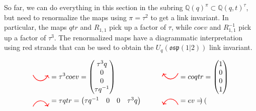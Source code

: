 \documentclass{amsart}
\newcommand{\hackcenter}[1]{
 \xy (0,0)*{#1}; \endxy}
\def\Q{\mathsf{Q}}
\theoremstyle{plain}
\theoremstyle{definition}
\theoremstyle{definition}
\numberwithin{equation}{section}
\numberwithin{theorem}{section}
\def\mf{\mathfrak}
\def\Q{\mathbb{Q}}
\numberwithin{equation}{section}
\begin{document}
So far, we can do everything in this section in the subring $\Q(q)^\pi\subset \Q(q,t)^\tau$, but need to renormalize the maps using $\pi=\tau^2$ to get a link invariant.
In particular, the maps $qtr$ and $R_{1,1}$ pick up a factor of $\tau$, while $coev$ and $R_{1,1}^{-1}$ pick up a factor of $\tau^3$.
The renormalized maps have a diagrammatic interpretation using red strands that can be used to obtain the $U_q({\mf{osp}(1|2)})$ link invariant.

\begin{align}\label{eq:red-maps}
  \hackcenter{ \begin{tikzpicture} [scale=.75]
\draw[thick,   red, ->] (0,1).. controls ++(.25,-.5) and ++(-.25,-.5).. (1,1);
\end{tikzpicture}} & = \tau^3 coev =
\begin{pmatrix}
     \tau^3q \\
     0 \\
     0 \\
     \tau q^{-1}
   \end{pmatrix}  & \qquad \hackcenter{ \begin{tikzpicture} [scale=.75]
\draw[thick,   red, <-] (0,1).. controls ++(.25,-.5) and ++(-.25,-.5).. (1,1);
\end{tikzpicture}} & = coqtr =
\begin{pmatrix}
     1 \\
     0 \\
     0 \\
     1
   \end{pmatrix} \\
\hackcenter{ \begin{tikzpicture} [scale=.75]
\draw[thick,   red, ->] (0,0).. controls ++(.25,.5) and ++(-.25,.5).. (1,0);
\end{tikzpicture}} & = \tau qtr =
\begin{pmatrix}
    \tau q^{-1} & 0 & 0 & \tau^3 q
  \end{pmatrix} & \qquad \hackcenter{ \begin{tikzpicture} [scale=.75]
\draw[thick,   red, <-] (0,0).. controls ++(.25,.5) and ++(-.25,.5).. (1,0);
\end{tikzpicture}} & = ev =
\begin{pmatrix}

\end{pmatrix}
\end{align}
\end{document}
